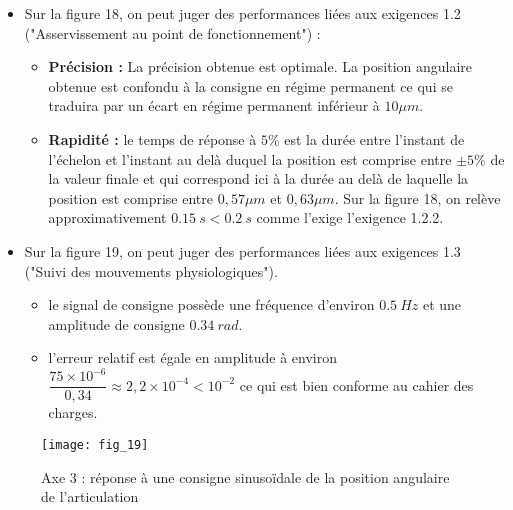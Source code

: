 \ifprof
\begin{corrige}
\begin{itemize}
\item Sur la figure 18, on peut juger des performances liées aux exigences 1.2 ("Asservissement au point de fonctionnement") :
\begin{itemize}
\item \textbf{Précision :} La précision obtenue est optimale. La position angulaire obtenue est confondu à la consigne en régime permanent ce qui se traduira par un écart en régime permanent inférieur à $10\mu m$.
\item \textbf{Rapidité : } le temps de réponse à $5\%$ est la durée entre l'instant de l'échelon et l'instant au delà duquel la position est comprise entre $\pm 5\%$ de la valeur finale et qui correspond ici à la durée au delà de laquelle la position est comprise entre $0,57\mu m$ et $0,63\mu m$. Sur la figure 18, on relève approximativement $\SI{0,15}{s}<\SI{0,2}{s}$ comme l'exige l'exigence 1.2.2.  
\end{itemize}
\item Sur la figure 19, on peut juger des performances liées aux exigences 1.3 ("Suivi des mouvements physiologiques"). 
\begin{itemize}
\item le signal de consigne possède une fréquence d'environ $\SI{0,5}{Hz}$ et une amplitude de consigne $\SI{0,34}{rad}$. 
\item l'erreur relatif est égale en amplitude à environ $\dfrac{75\times 10^{-6}}{0,34}\approx 2,2\times 10^{-4}<10^{-2}$ ce qui est bien conforme au cahier des charges.
\end{itemize}
\end{itemize}
\end{corrige}
\else
\fi
\begin{figure}[!h]
\centering
\texttt{[image: fig\_19]}

\caption{\label{fig_19} Axe 3 : réponse à une consigne sinusoïdale de la position angulaire de l’articulation}
\end{figure}